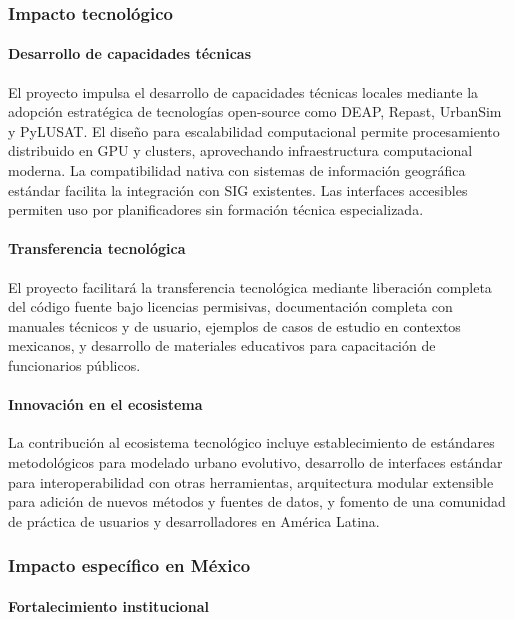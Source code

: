 \subsubsection{Impacto tecnológico}

\paragraph{Desarrollo de capacidades técnicas}

El proyecto impulsa el desarrollo de capacidades técnicas locales mediante la adopción estratégica de tecnologías open-source como DEAP, Repast, UrbanSim y PyLUSAT. El diseño para escalabilidad computacional permite procesamiento distribuido en GPU y clusters, aprovechando infraestructura computacional moderna. La compatibilidad nativa con sistemas de información geográfica estándar facilita la integración con SIG existentes. Las interfaces accesibles permiten uso por planificadores sin formación técnica especializada.

\paragraph{Transferencia tecnológica}

El proyecto facilitará la transferencia tecnológica mediante liberación completa del código fuente bajo licencias permisivas, documentación completa con manuales técnicos y de usuario, ejemplos de casos de estudio en contextos mexicanos, y desarrollo de materiales educativos para capacitación de funcionarios públicos.

\paragraph{Innovación en el ecosistema}

La contribución al ecosistema tecnológico incluye establecimiento de estándares metodológicos para modelado urbano evolutivo, desarrollo de interfaces estándar para interoperabilidad con otras herramientas, arquitectura modular extensible para adición de nuevos métodos y fuentes de datos, y fomento de una comunidad de práctica de usuarios y desarrolladores en América Latina.

\subsubsection{Impacto específico en México}

\paragraph{Fortalecimiento institucional}

